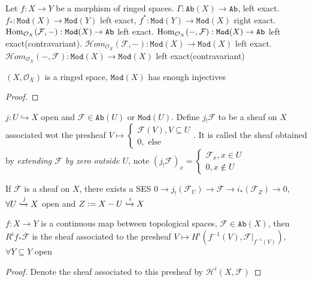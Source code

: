 \documentclass[main]{subfiles}
\begin{document}
\begin{example}
Let $f:X\to Y$ be a morphism of ringed spaces. $\Gamma:\texttt{Ab}(X)\to \texttt{Ab}$, left exact. $f_*:\texttt{Mod}(X)\to \texttt{Mod}(Y)$ left exact, $f^*:\texttt{Mod}(Y)\to \texttt{Mod}(X)$ right exact. $\operatorname{Hom}_{\mathcal O_X}(\mathcal F,-):\texttt{Mod}(X)\to\texttt{Ab}$ left exact. $\operatorname{Hom}_{\mathcal O_X}(-,\mathcal F):\texttt{Mod}(X)\to \texttt{Ab}$ left exact(contravariant). $\mathcal Hom_{\mathcal O_X}(\mathcal F,-):\texttt{Mod}(X)\to \texttt{Mod}(X)$ left exact. $\mathcal Hom_{\mathcal O_X}(-,\mathcal F):\texttt{Mod}(X)\to \texttt{Mod}(X)$ left exact(contravariant)
\end{example}

\clubsuit\quad $(X,\mathcal O_X)$ is a ringed space, $\texttt{Mod}(X)$ has enough injectives

\begin{proof}

\end{proof}

\begin{definition}
$j:U\hookrightarrow X$ open and $\mathcal F\in \texttt{Ab}(U)$ or $\texttt{Mod}(U)$. Define $j_!\mathcal F$ to be a sheaf on $X$ associated wot the presheaf $V\mapsto\begin{cases}
\mathcal F(V), V\subseteq U\\
0, \text{ else}
\end{cases}$. It is called the  sheaf obtained by \textit{extending $\mathcal F$ by zero outside $U$}, note $(j_!\mathcal F)_x=\begin{cases}
\mathcal F_x,x\in U \\
0, x\notin U
\end{cases}$
\end{definition}

\clubsuit\quad If $\mathcal F$ is a sheaf on $X$, there exists a SES $0\to j_!(\mathcal F_U)\to\mathcal F\to i_*(\mathcal F_Z)\to 0$, $\forall U\xhookrightarrow{j}X$ open and $Z:=X-U\xhookrightarrow{i}X$

\clubsuit\quad $f:X\to Y$ is a continuous map between topological spaces, $\mathcal F\in\texttt{Ab}(X)$, then $R^if_*\mathcal F$ is the sheaf associated to the presheaf $V\mapsto H^i(f^{-1}(V),\mathcal F|_{f^{-1}(V)})$, $\forall Y\subseteq Y$ open

\begin{proof}
Denote the sheaf associated to this presheaf by $\mathcal H^i(X,\mathcal F)$
\end{proof}
\end{document}
